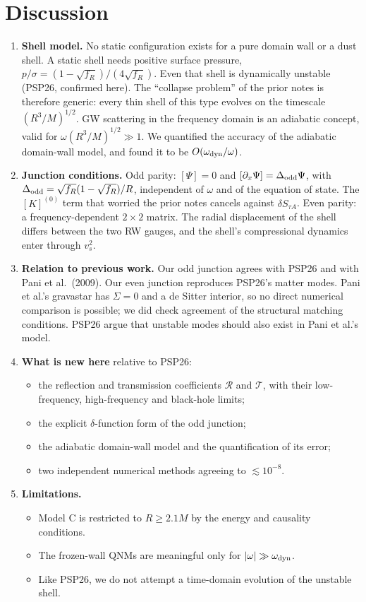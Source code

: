 \documentclass[11pt,a4paper]{article}
\numberwithin{equation}{section}
\newcommand{\sq}{\sqrt{f_R}}
\begin{document}
\section{Discussion}\label{sec:disc}
\begin{enumerate}
\item \textbf{Shell model.} No static configuration exists for a pure domain wall or a dust shell. A static
shell needs positive surface pressure, $p/\sigma=(1-\sq)/(4\sq)$. Even that shell is dynamically unstable
(PSP26, confirmed here). The ``collapse problem'' of the prior notes is therefore generic: every thin shell
of this type evolves on the timescale $(R^3/M)^{1/2}$. GW scattering in the frequency domain is an adiabatic
concept, valid for $\omega(R^3/M)^{1/2}\gg1$. We quantified the accuracy of the adiabatic domain-wall model,
and found it to be $O(\omega_{\rm dyn}/\omega)$.
\item \textbf{Junction conditions.} Odd parity: $[\Psi]=0$ and $[\partial_x\Psi]=\Delta_{\rm odd}\Psi$, with
$\Delta_{\rm odd}=\sq(1-\sq)/R$, independent of $\omega$ and of the equation of state. The $[K]^{(0)}$ term that
worried the prior notes cancels against $\delta S_{\tau A}$. Even parity: a frequency-dependent $2\times2$
matrix. The radial displacement of the shell differs between the two RW gauges, and the shell's
compressional dynamics enter through $v_s^2$.
\item \textbf{Relation to previous work.} Our odd junction agrees with PSP26 and with Pani et al.\ (2009).
Our even junction reproduces PSP26's matter modes. Pani et al.'s gravastar has $\Sigma=0$ and a de Sitter
interior, so no direct numerical comparison is possible; we did check agreement of the structural matching
conditions. PSP26 argue that unstable modes should also exist in Pani et al.'s model.
\item \textbf{What is new here} relative to PSP26:
\begin{itemize}
\item the reflection and transmission coefficients $\mathcal R$ and $\mathcal T$, with their low-frequency,
high-frequency and black-hole limits;
\item the explicit $\delta$-function form of the odd junction;
\item the adiabatic domain-wall model and the quantification of its error;
\item two independent numerical methods agreeing to $\lesssim10^{-8}$.
\end{itemize}
\item \textbf{Limitations.}
\begin{itemize}
\item Model C is restricted to $R\ge2.1M$ by the energy and causality conditions.
\item The frozen-wall QNMs are meaningful only for $|\omega|\gg\omega_{\rm dyn}$.
\item Like PSP26, we do not attempt a time-domain evolution of the unstable shell.
\end{itemize}
\end{enumerate}
\end{document}
